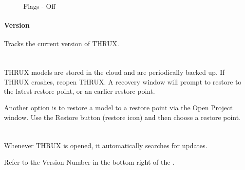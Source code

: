 \documentclass[letterpaper,10pt,english]{sphinxmanual}
\begin{document}
\begin{figure}[H]
\centering
\capstart

\noindent{}
\caption{Flags - Off}\label{\detokenize{docs/userguide/explorersandutilitytools/statusbar/index-status_bar:id11}}\end{figure}


\paragraph{Version}
\label{\detokenize{docs/userguide/explorersandutilitytools/statusbar/index-status_bar:version}}\label{\detokenize{docs/userguide/explorersandutilitytools/statusbar/index-status_bar:id8}}
Tracks the current version of THRUX.


\section{}
\label{\detokenize{docs/userguide/index-user_guide:recovery-options}}\label{\detokenize{docs/userguide/index-user_guide:id11}}
THRUX models are stored in the cloud and are periodically backed up.  If THRUX crashes, reopen THRUX.  A recovery window will prompt to restore to the latest restore point, or an earlier restore point.

\begin{figure}[H]
\centering

\noindent{}
\end{figure}

Another option is to restore a model to a restore point via the Open Project window.  Use the Restore button (restore icon) and then choose a restore point.

\begin{figure}[H]
\centering

\noindent{}
\end{figure}


\section{}
\label{\detokenize{docs/userguide/index-user_guide:automatic-updates}}\label{\detokenize{docs/userguide/index-user_guide:release-data}}
Whenever THRUX is opened, it automatically searches for updates.

Refer to the Version Number in the bottom right of the {\hyperref[\detokenize{docs/userguide/explorersandutilitytools/statusbar/index-status_bar:status-bar}]{}}.
\end{document}
